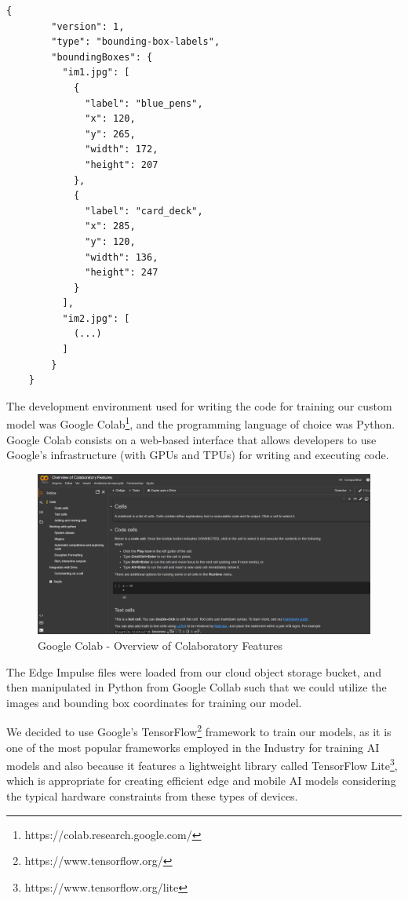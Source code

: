 \documentclass[openright]{normas-utf-tex} %
\begin{document}
\begin{lstlisting}[caption={Bounding boxes coordinates file exported from Edge Impulse},label={lst:boundingBoxCoordinates}]
	{
		"version": 1,
		"type": "bounding-box-labels",
		"boundingBoxes": {
		  "im1.jpg": [
			{
			  "label": "blue_pens",
			  "x": 120,
			  "y": 265,
			  "width": 172,
			  "height": 207
			},
			{
			  "label": "card_deck",
			  "x": 285,
			  "y": 120,
			  "width": 136,
			  "height": 247
			}
		  ],
		  "im2.jpg": [
			(...)
		  ]
		}
	}
\end{lstlisting}

The development environment used for writing the code for training our custom model
was Google Colab\footnote{https://colab.research.google.com/}, and the programming language 
of choice was Python. 
Google Colab consists on a web-based interface that allows developers
to use Google's infrastructure (with GPUs and TPUs) for writing and executing code.

\begin{figure}[H]
	\centering
	\includegraphics[width=1\textwidth]{./images/google-colab.png}
	\caption[Google Colab - Overview of Colaboratory Features]{Google Colab - Overview of Colaboratory Features}
    \label{fig:diff}
\end{figure}

The Edge Impulse files were loaded from our cloud object storage bucket, and then manipulated in Python
from Google Collab such that we could utilize the images and bounding box coordinates for training
our model.

We decided to use Google's TensorFlow\footnote{https://www.tensorflow.org/} framework to train our 
models, as it is one of the most popular frameworks employed in the Industry for training AI models
and also because it features a lightweight library called TensorFlow Lite\footnote{https://www.tensorflow.org/lite}, 
which is appropriate for creating efficient edge and mobile AI models considering the 
typical hardware constraints from these types of devices.
\end{document}
